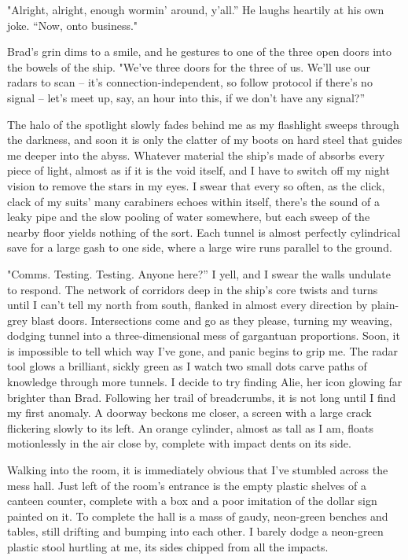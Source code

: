 "Alright, alright, enough wormin’ around, y’all.” He laughs heartily at his own joke. “Now, onto business." 

 Brad's grin dims to a smile, and he gestures to one of the three open doors into the bowels of the ship. "We’ve three doors for the three of us. We’ll use our radars to scan – it’s connection-independent, so follow protocol if there’s no signal – let’s meet up, say, an hour into this, if we don’t have any signal?” 

The halo of the spotlight slowly fades behind me as my flashlight sweeps through the darkness, and soon it is only the clatter of my boots on hard steel that guides me deeper into the abyss. Whatever material the ship’s made of absorbs every piece of light, almost as if it is the void itself, and I have to switch off my night vision to remove the stars in my eyes. I swear that every so often, as the click, clack of my suits’ many carabiners echoes within itself, there’s the sound of a leaky pipe and the slow pooling of water somewhere, but each sweep of the nearby floor yields nothing of the sort. Each tunnel is almost perfectly cylindrical save for a large gash to one side, where a large wire runs parallel to the ground.  

"Comms. Testing. Testing. Anyone here?” I yell, and I swear the walls undulate to respond. The network of corridors deep in the ship's core twists and turns until I can't tell my north from south, flanked in almost every direction by plain-grey blast doors. Intersections come and go as they please, turning my weaving, dodging tunnel into a three-dimensional mess of gargantuan proportions. Soon, it is impossible to tell which way I’ve gone, and panic begins to grip me. The radar tool glows a brilliant, sickly green as I watch two small dots carve paths of knowledge through more tunnels. I decide to try finding Alie, her icon glowing far brighter than Brad. Following her trail of breadcrumbs, it is not long until I find my first anomaly. A doorway beckons me closer, a screen with a large crack flickering slowly to its left. An orange cylinder, almost as tall as I am, floats motionlessly in the air close by, complete with impact dents on its side.  

Walking into the room, it is immediately obvious that I've stumbled across the mess hall. Just left of the room’s entrance is the empty plastic shelves of a canteen counter, complete with a box and a poor imitation of the dollar sign painted on it. To complete the hall is a mass of gaudy, neon-green benches and tables, still drifting and bumping into each other. I barely dodge a neon-green plastic stool hurtling at me, its sides chipped from all the impacts.   

